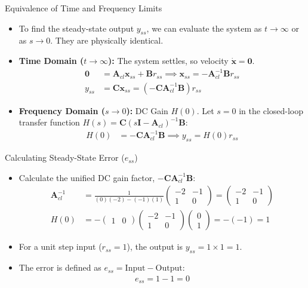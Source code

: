 \documentclass{beamer}
\theoremstyle{remark}
\newcommand{\myvec}[1]{\ensuremath{\begin{pmatrix}#1\end{pmatrix}}}
\let\vec\mathbf
\numberwithin{equation}{section}
\begin{document}
\begin{frame}{Equivalence of Time and Frequency Limits}
    \begin{itemize}
        \item To find the steady-state output $y_{ss}$, we can evaluate the system as $t \to \infty$ or as $s \to 0$. They are physically identical.
        \vspace{0.2cm}
        \item \textbf{Time Domain ($t \to \infty$):} The system settles, so velocity $\dot{\vec{x}} = \vec{0}$.
        \begin{align}
            \vec{0} &= \vec{A}_{cl}\vec{x}_{ss} + \vec{B}r_{ss} \implies \vec{x}_{ss} = -\vec{A}_{cl}^{-1}\vec{B}r_{ss} \\
            y_{ss} &= \vec{C}\vec{x}_{ss} = \left(-\vec{C}\vec{A}_{cl}^{-1}\vec{B}\right)r_{ss}
        \end{align}
        \vspace{0.2cm}
        \item \textbf{Frequency Domain ($s \to 0$):} DC Gain $H(0)$. Let $s=0$ in the closed-loop transfer function $H(s) = \vec{C}(s\vec{I} - \vec{A}_{cl})^{-1}\vec{B}$:
        \begin{align}
            H(0) &= -\vec{C}\vec{A}_{cl}^{-1}\vec{B} \implies y_{ss} = H(0)r_{ss}
        \end{align}
    \end{itemize}
\end{frame}

\begin{frame}{Calculating Steady-State Error ($e_{ss}$)}
    \begin{itemize}
        \item Calculate the unified DC gain factor, $-\vec{C}\vec{A}_{cl}^{-1}\vec{B}$:
        \begin{align}
            \vec{A}_{cl}^{-1} &= \frac{1}{(0)(-2)-(-1)(1)} \myvec{ -2 & -1 \\ 1 & 0 } = \myvec{ -2 & -1 \\ 1 & 0 } \\
            H(0) &= -\myvec{ 1 & 0 } \myvec{ -2 & -1 \\ 1 & 0 } \myvec{ 0 \\ 1 } = -(-1) = 1
        \end{align}
        \item For a unit step input ($r_{ss} = 1$), the output is $y_{ss} = 1 \times 1 = 1$.
        \item The error is defined as $e_{ss} = \text{Input} - \text{Output}$:
        \begin{align}
            e_{ss} = 1 - 1 = 0
        \end{align}
    \end{itemize}
\end{frame}
\end{document}
